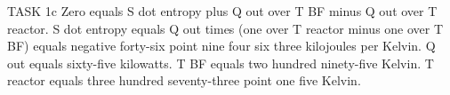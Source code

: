 TASK 1c  
Zero equals S dot entropy plus Q out over T BF minus Q out over T reactor.  
S dot entropy equals Q out times (one over T reactor minus one over T BF) equals negative forty-six point nine four six three kilojoules per Kelvin.  
Q out equals sixty-five kilowatts.  
T BF equals two hundred ninety-five Kelvin.  
T reactor equals three hundred seventy-three point one five Kelvin.